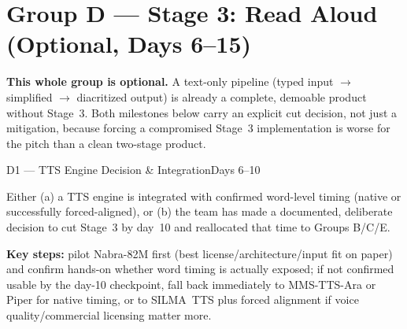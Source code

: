\documentclass[11pt,a4paper]{article}
\begin{document}
\section{Group D --- Stage 3: Read Aloud (Optional, Days 6--15)}
\label{sec:group-d}

\begin{noteb}
\textbf{This whole group is optional.} A text-only pipeline (typed input
$\to$ simplified $\to$ diacritized output) is already a complete, demoable
product without Stage~3. Both milestones below carry an explicit cut
decision, not just a mitigation, because forcing a compromised Stage~3
implementation is worse for the pitch than a clean two-stage product.
\end{noteb}

\begin{milestonehead}{D1 --- TTS Engine Decision \& Integration}{Days 6--10}
\begin{goalbox}
Either (a) a TTS engine is integrated with confirmed word-level timing
(native or successfully forced-aligned), or (b) the team has made a
documented, deliberate decision to cut Stage~3 by day~10 and reallocated
that time to Groups B/C/E.
\end{goalbox}

\textbf{Key steps:} pilot Nabra-82M first (best license/architecture/input
fit on paper) and confirm hands-on whether word timing is actually exposed;
if not confirmed usable by the day-10 checkpoint, fall back immediately to
MMS-TTS-Ara or Piper for native timing, or to SILMA~TTS plus forced
alignment if voice quality/commercial licensing matter more.


\end{milestonehead}
\end{document}
